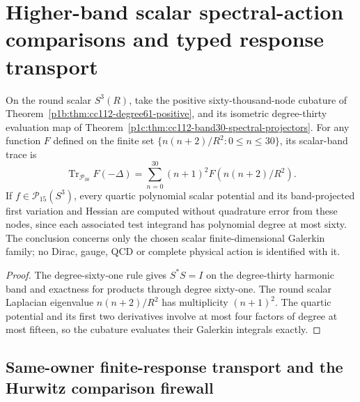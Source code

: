 \documentclass[12pt,a4paper]{article}
\begin{document}
\section{Higher-band scalar spectral-action comparisons and typed response transport}
\label{p3b:sec:cc20-band30-math-consumer}
\begin{corollary}
\label{p3b:cor:cc20-band30-action-comparison}
On the round scalar $S^3(R)$, take the positive sixty-thousand-node
cubature of Theorem~\ref{p1b:thm:cc112-degree61-positive}, and
its isometric degree-thirty evaluation map of
Theorem~\ref{p1c:thm:cc112-band30-spectral-projectors}.
For any function $F$ defined on the finite set
$\{n(n+2)/R^2:0\le n\le30\}$, its scalar-band trace is
\[
 \boxed{\operatorname{Tr}_{\mathcal P_{30}} F(-\Delta)
 =\sum_{n=0}^{30}(n+1)^2F(n(n+2)/R^2).}
\]
If $f\in\mathcal P_{15}(S^3)$, every quartic polynomial scalar
potential and its band-projected first variation and Hessian are
computed without quadrature error from these nodes, since each
associated test integrand has polynomial degree at most sixty.
The conclusion concerns only the chosen scalar finite-dimensional
Galerkin family; no Dirac, gauge, QCD or complete physical action is
identified with it.
\end{corollary}
\begin{proof}
The degree-sixty-one rule gives $S^*S=I$ on the degree-thirty
harmonic band and exactness for products through degree sixty-one.
The round scalar Laplacian eigenvalue $n(n+2)/R^2$ has multiplicity
$(n+1)^2$.  The quartic potential and its first two derivatives
involve at most four factors of degree at most fifteen, so the
cubature evaluates their Galerkin integrals exactly.
\end{proof}


\subsection{Same-owner finite-response transport and the Hurwitz comparison firewall}
\label{p3b:subsec:s3-owner-transport-v1190}
\end{document}
